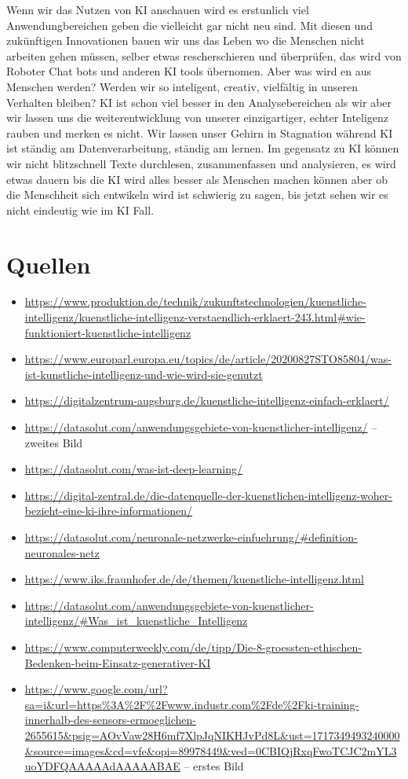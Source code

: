 \documentclass{report}
\begin{document}
 Wenn wir das Nutzen von KI anschauen wird es erstunlich viel Anwendungbereichen geben die vielleicht gar nicht neu sind. Mit diesen
 und zukünftigen Innovationen bauen wir uns das Leben wo die Menschen nicht arbeiten gehen müssen, selber etwas rescherschieren und überprüfen,
 das wird von Roboter Chat bots und anderen KI tools übernomen. Aber was wird en aus Menschen werden? Werden wir so inteligent, creativ, 
 vielfältig in unseren Verhalten bleiben? KI ist schon viel besser in den Analysebereichen als wir aber wir lassen uns die weiterentwicklung
 von unserer einzigartiger, echter Inteligenz rauben und merken es nicht. Wir lassen unser Gehirn in Stagnation während KI ist ständig am Datenverarbeitung,
 ständig am lernen. Im gegensatz zu KI können wir nicht blitzschnell Texte durchlesen, zusammenfassen und analysieren, 
 es wird etwas dauern bis die KI wird alles besser als Menschen machen können aber ob die Menschheit sich entwikeln wird ist schwierig zu sagen,
 bis jetzt sehen wir es nicht eindeutig wie im KI Fall. 
\section{Quellen}


\begin{itemize}
\item \url{https://www.produktion.de/technik/zukunftstechnologien/kuenstliche-intelligenz/kuenstliche-intelligenz-verstaendlich-erklaert-243.html#wie-funktioniert-kuenstliche-intelligenz}
\item \url{https://www.europarl.europa.eu/topics/de/article/20200827STO85804/was-ist-kunstliche-intelligenz-und-wie-wird-sie-genutzt}
\item \url{https://digitalzentrum-augsburg.de/kuenstliche-intelligenz-einfach-erklaert/}
\item \url{https://datasolut.com/anwendungsgebiete-von-kuenstlicher-intelligenz/} -- zweites Bild
\item \url{https://datasolut.com/was-ist-deep-learning/} 
\item \url{https://digital-zentral.de/die-datenquelle-der-kuenstlichen-intelligenz-woher-bezieht-eine-ki-ihre-informationen/}
\item \url{https://datasolut.com/neuronale-netzwerke-einfuehrung/#definition-neuronales-netz}
\item \url{https://www.iks.fraunhofer.de/de/themen/kuenstliche-intelligenz.html}
\item \url{https://datasolut.com/anwendungsgebiete-von-kuenstlicher-intelligenz/#Was_ist_kuenstliche_Intelligenz}
\item \url{https://www.computerweekly.com/de/tipp/Die-8-groessten-ethischen-Bedenken-beim-Einsatz-generativer-KI}
\item \url{https://www.google.com/url?sa=i&url=https%3A%2F%2Fwww.industr.com%2Fde%2Fki-training-innerhalb-des-sensors-ermoeglichen-2655615&psig=AOvVaw28H6mf7XlpJqNIKHJvPd8L&ust=1717349493240000&source=images&cd=vfe&opi=89978449&ved=0CBIQjRxqFwoTCJC2mYL3uoYDFQAAAAAdAAAAABAE} -- erstes Bild
\end{itemize}

\printbibliography
\end{document}
